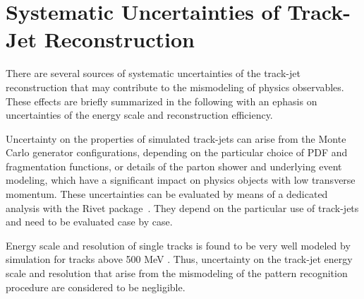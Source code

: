 

\section{Systematic Uncertainties of Track-Jet Reconstruction}\label{sec:trackjetsys}

%
%


There are several sources of systematic uncertainties of the track-jet reconstruction that may contribute to
the mismodeling of physics observables.  These effects  are briefly summarized in the following with an ephasis on 
uncertainties of the energy scale and reconstruction efficiency. %

Uncertainty on the properties of simulated track-jets can arise from the Monte Carlo generator
configurations, depending on the particular choice of PDF and fragmentation functions, or details of the parton shower and underlying 
event modeling, which have a significant impact on physics objects with low transverse momentum. 
These uncertainties can be evaluated by means of a dedicated analysis with the Rivet package~\cite{RIVET}.
They depend on the particular  use of track-jets and need to be evaluated case by case.

Energy scale and resolution of single tracks is found to be very well modeled by simulation for tracks above
500 MeV \cite{IDperformance}. Thus, uncertainty on the track-jet energy scale and resolution that arise from the mismodeling of
the pattern recognition procedure are considered to be negligible. 

